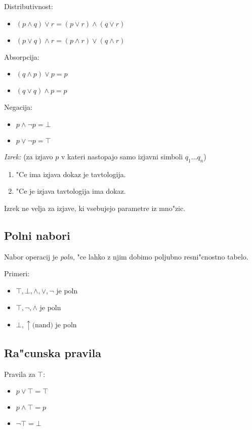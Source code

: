 Distributivnost:
\begin{itemize}
	\item $(p \land q) \lor r = (p \lor r) \land (q \lor r)$
	\item $(p \lor q) \land r = (p \land r) \lor (q \land r)$
\end{itemize}

Absorpcija:
\begin{itemize}
	\item $(q \land p) \lor p = p$
	\item $(q \lor q) \land p = p$
\end{itemize}

Negacija:
\begin{itemize}
	\item $p \land \neg p = \bot$
	\item $p \lor \lnot p = \top$
\end{itemize}

\emph{Izrek:} (za izjavo $p$ v kateri nastopajo samo izjavni simboli $q_1 \ldots q_n$)
\begin{enumerate}
	\item "Ce ima izjava dokaz je tavtologija.
	\item "Ce je izjava tavtologija ima dokaz.
\end{enumerate}
Izrek ne velja za izjave, ki vsebujejo parametre iz mno"zic.

\subsection{Polni nabori}
Nabor operacij je \emph{poln}, "ce lahko z njim dobimo poljubno resni"cnostno tabelo.

Primeri:
\begin{itemize}
	\item $\top, \bot, \land, \lor, \lnot$ je poln
	\item $\top, \lnot, \land$ je poln
	\item $\bot, \uparrow \text{(nand)}$ je poln
\end{itemize}

\subsection{Ra"cunska pravila}
Pravila za $\top$:
\begin{itemize}
	\item $p \lor \top = \top$
	\item $p \land \top = p$
	\item $\lnot \top = \bot$
\end{itemize}

